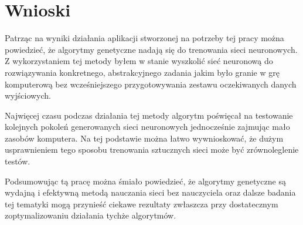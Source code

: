 \documentclass[12pt, oneside, a4paper]{report}
\begin{document}

\chapter{Wnioski}

Patrząc na wyniki działania aplikacji stworzonej na potrzeby tej pracy można powiedzieć, że algorytmy genetyczne nadają się do trenowania sieci neuronowych. Z wykorzystaniem tej metody byłem w stanie wyszkolić sieć neuronową do rozwiązywania konkretnego, abstrakcyjnego zadania jakim było granie w grę komputerową bez wcześniejszego przygotowywania zestawu oczekiwanych danych wyjściowych.

Najwięcej czasu podczas działania tej metody algorytm poświęcał na testowanie kolejnych pokoleń generowanych sieci neuronowych jednocześnie zajmując mało zasobów komputera. Na tej podstawie można łatwo wywnioskować, że dużym usprawnieniem tego sposobu trenowania sztucznych sieci może być zrównoleglenie testów.

Podsumowując tą pracę można śmiało powiedzieć, że algorytmy genetyczne są wydajną i efektywną metodą nauczania sieci bez nauczyciela oraz dalsze badania tej tematyki mogą przynieść ciekawe rezultaty zwłaszcza przy dostatecznym zoptymalizowaniu działania tychże algorytmów.

\pagebreak


\end{document}
